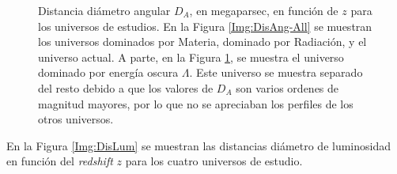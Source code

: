 \documentclass[twoside]{article}
\begin{document}
\begin{figure}[H]
\begin{subfigure}{.5\textwidth}
							\label{Img:DisAng-EngOsc}
						\end{subfigure}
						\caption{Distancia diámetro angular $D_A$, en megaparsec, en función de $z$ para los universos de estudios. En la Figura \ref{Img:DisAng-All} se muestran los universos dominados por Materia, dominado por Radiación, y el universo actual. A parte, en la Figura \ref{Img:DisAng-EngOsc}, se muestra el universo dominado por energía oscura $\Lambda$. Este universo se muestra separado del resto debido a que los valores de $D_A$ son varios ordenes de magnitud mayores, por lo que no se apreciaban los perfiles de los otros universos.}
						\label{Img:DisAng}
					\end{figure}

				En la Figura \ref{Img:DisLum} se muestran las distancias diámetro de luminosidad en función del \textit{redshift} $z$ para los cuatro universos de estudio.
\end{document}
